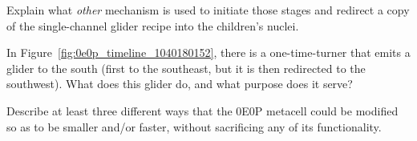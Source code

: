 \begin{multicols}{2}
\begin{problem}
		\noindent Explain what \emph{other} mechanism is used to initiate those stages and redirect a copy of the single-channel glider recipe into the children's nuclei.
	\end{problem}


	\mfilbreak
	
	
	\begin{problemstar}\label{exer:0e0p_extra_south_glider} 
		In Figure~\ref{fig:0e0p_timeline_1040180152}, there is a one-time-turner that emits a glider to the south (first to the southeast, but it is then redirected to the southwest). What does this glider do, and what purpose does it serve?
	\end{problemstar}


	\mfilbreak
	
	
	\begin{problem}\label{exer:0e0p_how_make_faster} 
		Describe at least three different ways that the 0E0P metacell could be modified so as to be smaller and/or faster, without sacrificing any of its functionality.
	\end{problem}
	
	
\end{multicols}
\normalsize\vspace*{0.01cm}
